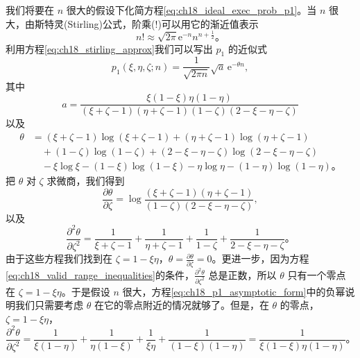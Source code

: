 我们将要在 $n$ 很大的假设下化简方程\eqref{eq:ch18_ideal_exec_prob_p1}。当 $n$ 很大，由斯特灵(Stirling)公式，阶乘($!$)可以用它的渐近值表示
\begin{equation}
n! \approx \sqrt{2\pi} \mathrm{e}^{-n} n^{n+\frac{1}{2}}。
\label{eq:ch18_stirling_approx}
\end{equation}
利用方程\eqref{eq:ch18_stirling_approx}我们可以写出 $p_1$ 的近似式
\begin{equation}
p_1(\xi,\eta,\zeta;n) = \frac{1}{\sqrt{2\pi n}} \sqrt{a}\, \mathrm{e}^{-\theta n},
\label{eq:ch18_p1_asymptotic_form}
\end{equation}
其中
\begin{equation}
a = \frac{\xi(1-\xi)\eta(1-\eta)}{(\xi+\zeta-1)(\eta+\zeta-1)(1-\zeta)(2-\xi-\eta-\zeta)}
\label{eq:ch18_def_a_coeff}
\end{equation}
以及
\begin{equation}
\begin{aligned}
\theta &= (\xi+\zeta-1)\log(\xi+\zeta-1) + (\eta+\zeta-1)\log(\eta+\zeta-1) \\
&\quad + (1-\zeta)\log(1-\zeta) + (2-\xi-\eta-\zeta)\log(2-\xi-\eta-\zeta) \\
&\quad - \xi\log\xi - (1-\xi)\log(1-\xi) - \eta\log\eta - (1-\eta)\log(1-\eta)。
\end{aligned}
\label{eq:ch18_def_theta_function}
\end{equation}
把 $\theta$ 对 $\zeta$ 求微商，我们得到
\begin{equation}
\frac{\partial \theta}{\partial \zeta} = \log\frac{(\xi+\zeta-1)(\eta+\zeta-1)}{(1-\zeta)(2-\xi-\eta-\zeta)},
\label{eq:ch18_theta_first_deriv_zeta}
\end{equation}
以及
\begin{equation}
\frac{\partial^2 \theta}{\partial \zeta^2} = \frac{1}{\xi+\zeta-1} + \frac{1}{\eta+\zeta-1} + \frac{1}{1-\zeta} + \frac{1}{2-\xi-\eta-\zeta}。
\label{eq:ch18_theta_second_deriv_zeta}
\end{equation}
由于这些方程我们找到在 $\zeta=1-\xi\eta$，$\theta=\frac{\partial \theta}{\partial \zeta}=0$。更进一步，因为方程\eqref{eq:ch18_valid_range_inequalities}的条件，$\frac{\partial^2 \theta}{\partial \zeta^2}$ 总是正数，所以 $\theta$ 只有一个零点在 $\zeta=1-\xi\eta$。于是假设 $n$ 很大，方程\eqref{eq:ch18_p1_asymptotic_form}中的负幂说明我们只需要考虑 $\theta$ 在它的零点附近的情况就够了。但是，在 $\theta$ 的零点，$\zeta=1-\xi\eta$，
\begin{equation*}
\frac{\partial^2 \theta}{\partial \zeta^2} = \frac{1}{\xi(1-\eta)} + \frac{1}{\eta(1-\xi)} + \frac{1}{\xi\eta} + \frac{1}{(1-\xi)(1-\eta)} = \frac{1}{\xi(1-\xi)\eta(1-\eta)}。
\end{equation*}
